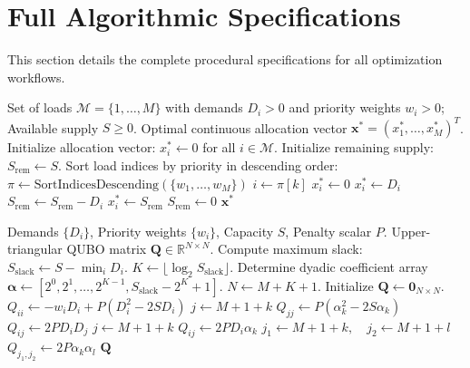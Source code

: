 \documentclass[11pt,a4paper]{article}
\theoremstyle{definition}
\theoremstyle{remark}
\begin{document}
\section{Full Algorithmic Specifications}
\label{sec:algorithms}

This section details the complete procedural specifications for all optimization workflows.

\begin{algorithm}[H]
\caption{Continuous Snapshot Dispatch via Fractional Knapsack Greedy Sorting}
\label{alg:greedy}
\begin{algorithmic}[1]
\REQUIRE Set of loads $\mathcal{M} = \{1, \dots, M\}$ with demands $D_i > 0$ and priority weights $w_i > 0$; Available supply $S \ge 0$.
\ENSURE Optimal continuous allocation vector $\mathbf{x}^* = (x_1^*, \dots, x_M^*)^T$.
\STATE Initialize allocation vector: $x_i^* \leftarrow 0$ for all $i \in \mathcal{M}$.
\STATE Initialize remaining supply: $S_{\text{rem}} \leftarrow S$.
\STATE Sort load indices by priority in descending order:
\STATE $\pi \leftarrow \text{SortIndicesDescending}(\{w_1, \dots, w_M\})$
    \STATE $i \leftarrow \pi[k]$
        \STATE $x_i^* \leftarrow 0$
        \STATE $x_i^* \leftarrow D_i$
        \STATE $S_{\text{rem}} \leftarrow S_{\text{rem}} - D_i$
    \ELSE
        \STATE $x_i^* \leftarrow S_{\text{rem}}$
        \STATE $S_{\text{rem}} \leftarrow 0$
    \ENDIF
\ENDFOR
\RETURN $\mathbf{x}^*$
\end{algorithmic}
\end{algorithm}

\begin{algorithm}[H]
\caption{QUBO Matrix Construction with Dyadic Slack Variable Expansion}
\label{alg:qubo_build}
\begin{algorithmic}[1]
\REQUIRE Demands $\{D_i\}$, Priority weights $\{w_i\}$, Capacity $S$, Penalty scalar $P$.
\ENSURE Upper-triangular QUBO matrix $\mathbf{Q} \in \mathbb{R}^{N \times N}$.
\STATE Compute maximum slack: $S_{\text{slack}} \leftarrow S - \min_i D_i$.
\STATE $K \leftarrow \lfloor \log_2 S_{\text{slack}} \rfloor$.
\STATE Determine dyadic coefficient array $\boldsymbol{\alpha} \leftarrow [2^0, 2^1, \dots, 2^{K-1}, S_{\text{slack}} - 2^K + 1]$.
\STATE $N \leftarrow M + K + 1$.
\STATE Initialize $\mathbf{Q} \leftarrow \mathbf{0}_{N \times N}$.
    \STATE $Q_{ii} \leftarrow -w_i D_i + P (D_i^2 - 2 S D_i)$
\ENDFOR
{}
    \STATE $j \leftarrow M + 1 + k$
    \STATE $Q_{jj} \leftarrow P (\alpha_k^2 - 2 S \alpha_k)$
\ENDFOR
{}
        \STATE $Q_{ij} \leftarrow 2 P D_i D_j$
    \ENDFOR
\ENDFOR
{}
        \STATE $j \leftarrow M + 1 + k$
        \STATE $Q_{ij} \leftarrow 2 P D_i \alpha_k$
    \ENDFOR
\ENDFOR
{}
        \STATE $j_1 \leftarrow M + 1 + k, \quad j_2 \leftarrow M + 1 + l$
        \STATE $Q_{j_1, j_2} \leftarrow 2 P \alpha_k \alpha_l$
    \ENDFOR
\ENDFOR
\RETURN $\mathbf{Q}$
\end{algorithmic}
\end{algorithm}
\end{document}
